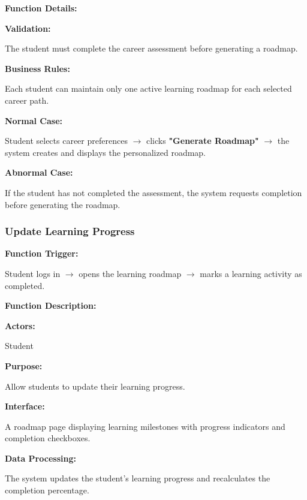\vspace{0.3cm}

\textbf{Function Details:}

\textbf{Validation:}

The student must complete the career assessment before generating a roadmap.

\textbf{Business Rules:}

Each student can maintain only one active learning roadmap for each selected career path.

\textbf{Normal Case:}

Student selects career preferences $\rightarrow$ clicks \textbf{"Generate Roadmap"} $\rightarrow$ the system creates and displays the personalized roadmap.

\textbf{Abnormal Case:}

If the student has not completed the assessment, the system requests completion before generating the roadmap.


\subsubsection{Update Learning Progress}

\textbf{Function Trigger:}

Student logs in $\rightarrow$ opens the learning roadmap $\rightarrow$ marks a learning activity as completed.

\vspace{0.3cm}

\textbf{Function Description:}

\textbf{Actors:}

Student

\vspace{0.2cm}

\textbf{Purpose:}

Allow students to update their learning progress.

\vspace{0.2cm}

\textbf{Interface:}

A roadmap page displaying learning milestones with progress indicators and completion checkboxes.

\vspace{0.2cm}

\textbf{Data Processing:}

The system updates the student's learning progress and recalculates the completion percentage.

